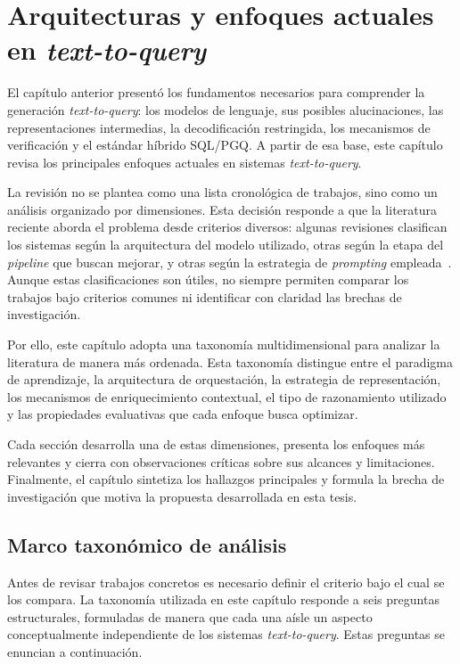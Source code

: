 \chapter{Arquitecturas y enfoques actuales en \emph{text-to-query}}
\label{chap:stateoftheart}

El capítulo anterior presentó los fundamentos necesarios para comprender la generación \emph{text-to-query}: los modelos de lenguaje, sus posibles alucinaciones, las representaciones intermedias, la decodificación restringida, los mecanismos de verificación y el estándar híbrido \ac{SQL}/\ac{PGQ}. A partir de esa base, este capítulo revisa los principales enfoques actuales en sistemas \emph{text-to-query}.

La revisión no se plantea como una lista cronológica de trabajos, sino como un análisis organizado por dimensiones. Esta decisión responde a que la literatura reciente aborda el problema desde criterios diversos: algunas revisiones clasifican los sistemas según la arquitectura del modelo utilizado, otras según la etapa del \emph{pipeline} que buscan mejorar, y otras según la estrategia de \emph{prompting} empleada~\cite{NLinterfaces}. Aunque estas clasificaciones son útiles, no siempre permiten comparar los trabajos bajo criterios comunes ni identificar con claridad las brechas de investigación.

Por ello, este capítulo adopta una taxonomía multidimensional para analizar la literatura de manera más ordenada. Esta taxonomía distingue entre el paradigma de aprendizaje, la arquitectura de orquestación, la estrategia de representación, los mecanismos de enriquecimiento contextual, el tipo de razonamiento utilizado y las propiedades evaluativas que cada enfoque busca optimizar.

Cada sección desarrolla una de estas dimensiones, presenta los enfoques más relevantes y cierra con observaciones críticas sobre sus alcances y limitaciones. Finalmente, el capítulo sintetiza los hallazgos principales y formula la brecha de investigación que motiva la propuesta desarrollada en esta tesis.

\section{Marco taxonómico de análisis}
\label{sec:sota-taxonomia}

Antes de revisar trabajos concretos es necesario definir el criterio bajo el
cual se los compara. La taxonomía utilizada en este capítulo responde a seis
preguntas estructurales, formuladas de manera que cada una aísle un aspecto
conceptualmente independiente de los sistemas \emph{text-to-query}. Estas
preguntas se enuncian a continuación.

